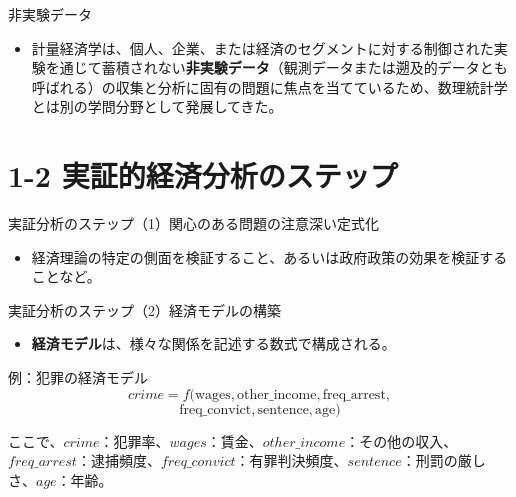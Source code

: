 \documentclass[
  ignorenonframetext,
]{beamer}
\providecommand{\tightlist}{%
  \setlength{\itemsep}{0pt}\setlength{\parskip}{0pt}}
\begin{document}
\begin{frame}{非実験データ}
\label{ux975eux5b9fux9a13ux30c7ux30fcux30bf}
\begin{itemize}
\tightlist
\item
  計量経済学は、個人、企業、または経済のセグメントに対する制御された実験を通じて蓄積されない\textbf{非実験データ}（観測データまたは遡及的データとも呼ばれる）の収集と分析に固有の問題に焦点を当てているため、数理統計学とは別の学問分野として発展してきた。
\end{itemize}
\end{frame}

\section{1-2
実証的経済分析のステップ}\label{ux5b9fux8a3cux7684ux7d4cux6e08ux5206ux6790ux306eux30b9ux30c6ux30c3ux30d7}

\begin{frame}{実証分析のステップ（1）関心のある問題の注意深い定式化}
\label{ux5b9fux8a3cux5206ux6790ux306eux30b9ux30c6ux30c3ux30d71ux95a2ux5fc3ux306eux3042ux308bux554fux984cux306eux6ce8ux610fux6df1ux3044ux5b9aux5f0fux5316}
\begin{itemize}
\tightlist
\item
  経済理論の特定の側面を検証すること、あるいは政府政策の効果を検証することなど。
\end{itemize}
\end{frame}

\begin{frame}{実証分析のステップ（2）経済モデルの構築}
\label{ux5b9fux8a3cux5206ux6790ux306eux30b9ux30c6ux30c3ux30d72ux7d4cux6e08ux30e2ux30c7ux30ebux306eux69cbux7bc9}
\begin{itemize}
\tightlist
\item
  \textbf{経済モデル}は、様々な関係を記述する数式で構成される。
\end{itemize}

\begin{block}{例：犯罪の経済モデル}
\label{ux4f8bux72afux7f6aux306eux7d4cux6e08ux30e2ux30c7ux30eb}
\[
crime = f(\text{wages}, \text{other\_income}, \text{freq\_arrest},\] \[
\text{freq\_convict}, \text{sentence}, \text{age})
\]

ここで、\(crime\)：犯罪率、\(wages\)：賃金、\(other\_income\)：その他の収入、\(freq\_arrest\)：逮捕頻度、\(freq\_convict\)：有罪判決頻度、\(sentence\)：刑罰の厳しさ、\(age\)：年齢。
\end{block}
\end{frame}
\end{document}
